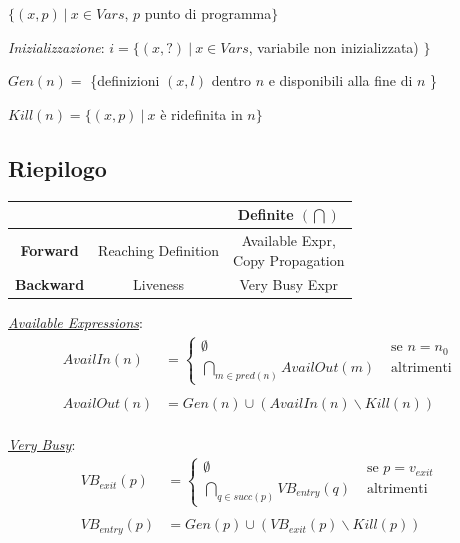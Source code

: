\documentclass[a4paper, 10pt]{book}
\begin{document}
$\{(x, p) ~|~ x\in Vars$, $p$ punto di programma$\}$

\textit{Inizializzazione}: $i=\{(x, ?) ~|~ x\in Vars$, variabile non inizializzata)  $\}$

$Gen(n) =$ \{definizioni $(x, l)$ dentro $n$ e disponibili alla fine di $n$ \}

$Kill(n) = \{(x,p) ~|~ x$ è ridefinita in $n \}$

\newpage
\subsection{Riepilogo}

\begin{center}
	\begin{tabular}{c|c|c}
		&\thead{\textbf{Possible $(\bigcup)$}}&\textbf{Definite $(\bigcap)$}\\ \hline
		\textbf{Forward}&Reaching Definition&\makecell{Available Expr, \\Copy Propagation}\\ \hline
		\makecell{\textbf{Backward}\\}&Liveness&Very Busy Expr\\
	\end{tabular}
\end{center}

\textit{\underline{Available Expressions}}:
\begin{align*}
	AvailIn(n) &= 
	\begin{cases}
		\emptyset &\text{ se } n = n_0 \\
		\bigcap_{m\in pred(n)} AvailOut(m) &\text{ altrimenti}
	\end{cases}\\ \\
	AvailOut(n) &= Gen(n) \cup (AvailIn(n)\backslash Kill(n))
\end{align*}
\\

\textit{\underline{Very Busy}}:
\begin{align*}
	VB_{exit}(p) &= 
	\begin{cases}
		\emptyset &\text{ se } p = v_{exit} \\
		\bigcap_{q\in succ(p)} VB_{entry}(q) &\text{ altrimenti}
	\end{cases}\\ \\
	VB_{entry}(p) &= Gen(p) \cup (VB_{exit}(p)\backslash Kill(p))
\end{align*}
\\
\end{document}
